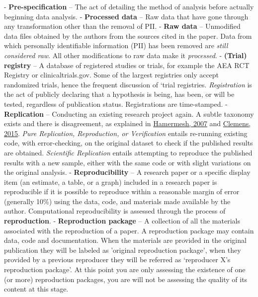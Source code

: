 \documentclass[]{book}
\begin{document}
- \textbf{Pre-specification} -- The act of detailing the method of analysis before actually beginning data analysis.
- \textbf{Processed data} -- Raw data that have gone through any transformation other than the removal of PII.
- \textbf{Raw data} -- Unmodified data files obtained by the authors from the sources cited in the paper. Data from which personally identifiable information (PII) has been removed are \emph{still considered raw}. All other modifications to raw data make it \emph{processed}.
- \textbf{(Trial) registry} -- A database of registered studies or trials, for example the AEA RCT Registry or clinicaltrials.gov. Some of the largest registries only accept randomized trials, hence the frequent discussion of `trial registries. \emph{Registration} is the act of publicly declaring that a hypothesis is being, has been, or will be tested, regardless of publication status. Registrations are time-stamped.
- \textbf{Replication} -- Conducting an existing research project again. A subtle taxonomy exists and there is disagreement, as explained in \href{https://poseidon01.ssrn.com/delivery.php?ID=730022068104120012124069127117116094125005035067064043105083109027064120011088086109059117052062000025007012029080123125089014014006079063116014095000023071022077006017094093005117096083119073115079022110105075073085121117103030106102080005099007\&EXT=pdf}{Hamermesh, 2007} and \href{https://www.cgdev.org/sites/default/files/CGD-Working-Paper-399-Clemens-Meaning-Failed-Replications.pdf}{Clemens, 2015}. \emph{Pure Replication, Reproduction, or Verification} entails re-running existing code, with error-checking, on the original dataset to check if the published results are obtained. \emph{Scientific Replication} entails attempting to reproduce the published results with a new sample, either with the same code or with slight variations on the original analysis.
- \textbf{Reproducibility} -- A research paper or a specific display item (an estimate, a table, or a graph) included in a research paper is reproducible if it is possible to reproduce within a reasonable margin of error (generally 10\%) using the data, code, and materials made available by the author. Computational reproducibility is assessed through the process of \textbf{reproduction}.
- \textbf{Reproduction package} -- A collection of all the materials associated with the reproduction of a paper. A reproduction package may contain data, code and documentation. When the materials are provided in the original publication they will be labeled as 'original reproduction package', when they provided by a previous reproducer they will be referred as `reproducer X's reproduction package'. At this point you are only assessing the existence of one (or more) reproduction packages, you are will not be assessing the quality of its content at this stage.
\end{document}
